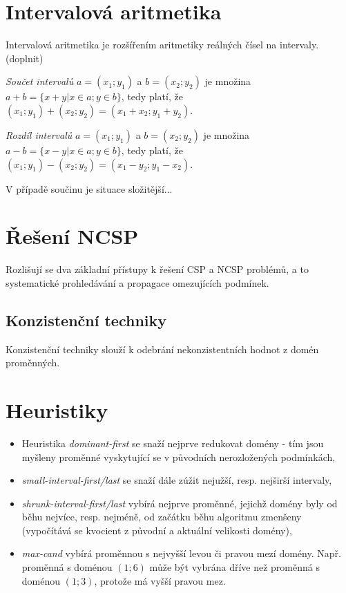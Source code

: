 \section{Intervalová aritmetika}
\label{ch:interval_arithmetic}
Intervalová aritmetika je rozšířením aritmetiky reálných čísel na intervaly. (doplnit)

\begin{definition}
\label{def:interval_add}
\emph {Součet intervalů} $a = (x_1; y_1)$ a $b = (x_2; y_2)$ je množina $a + b = \{x+y | x \in a; y \in b \}$, tedy platí, že $(x_1; y_1) + (x_2; y_2) = (x_1 + x_2; y_1 + y_2)$.
\end{definition}

\begin{definition}
\label{def:interval_sub}
\emph {Rozdíl intervalů} $a = (x_1; y_1)$ a $b = (x_2; y_2)$ je množina $a - b = \{x-y | x \in a; y \in b \}$, tedy platí, že $(x_1; y_1) - (x_2; y_2) = (x_1 - y_2; y_1 - x_2)$.
\end{definition}

V případě součinu je situace složitější... 


\section{Řešení NCSP}
Rozlišují se dva základní přístupy k řešení CSP a NCSP problémů, a to systematické prohledávání a propagace omezujících podmínek. \cite{Vu2005}

\subsection{Konzistenční techniky}
Konzistenční techniky slouží k odebrání nekonzistentních hodnot z domén proměnných.

\section{Heuristiky}
\begin{itemize}
  \item Heuristika \emph{dominant-first} se snaží nejprve redukovat domény  - tím jsou myšleny proměnné vyskytující se v původních nerozložených podmínkách,
  \item \emph{small-interval-first/last} se snaží dále zúžit nejužší, resp. nejširší intervaly,
  \item \emph{shrunk-interval-first/last} vybírá nejprve proměnné, jejichž domény byly od běhu nejvíce, resp. nejméně, od začátku běhu algoritmu zmenšeny (vypočítává se kvocient z původní a aktuální velikosti domény),
  \item \emph{max-cand} vybírá proměnnou s nejvyšší levou či pravou mezí domény. Např. proměnná s doménou $(1;6)$ může být vybrána dříve než proměnná s doménou $(1;3)$, protože má vyšší pravou mez.
\end{itemize}



